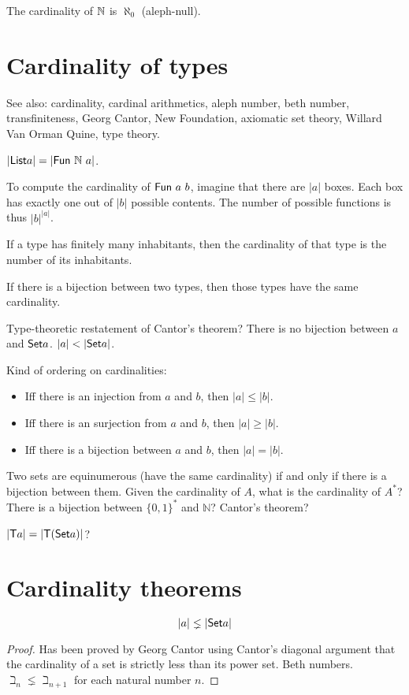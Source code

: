 The cardinality of $\mathbb{N}$ is $\aleph_0$ (aleph-null).

\section{Cardinality of types}

See also: cardinality, cardinal arithmetics,
aleph number, beth number, transfiniteness, Georg Cantor,
New Foundation, axiomatic set theory, Willard Van Orman Quine, type theory.

$|\textsf{List}{a}| = |\mathsf{Fun}~\mathbb{N}~a|$.

To compute the cardinality of $\mathsf{Fun}~a~b$,
imagine that there are $|a|$ boxes.
Each box has exactly one out of $|b|$ possible contents.
The number of possible functions is thus $|b|^{|a|}$.

If a type has finitely many inhabitants,
then the cardinality of that type is the number of its inhabitants.

If there is a bijection between two types,
then those types have the same cardinality.

Type-theoretic restatement of Cantor's theorem?
There is no bijection between $a$ and $\textsf{Set}{a}$.
$|a| < |\textsf{Set}{a}|$.

Kind of ordering on cardinalities:
\begin{itemize}
    \item Iff there is an injection from $a$ and $b$, then $|a| \le |b|$.
    \item Iff there is an surjection from $a$ and $b$, then $|a| \ge |b|$.
    \item Iff there is a bijection between $a$ and $b$, then $|a| = |b|$.
\end{itemize}

Two sets are equinumerous (have the same cardinality) if and only if there is a bijection between them.
Given the cardinality of $A$, what is the cardinality of $A^*$?
There is a bijection between $\{0,1\}^*$ and $\mathbb{N}$?
Cantor's theorem?

$|\mathsf{T} a| = |\mathsf{T} (\textsf{Set}{a})|$?

\section{Cardinality theorems}

\begin{mthm}
    \[
        |a| \lneq |\textsf{Set}{a}|
    \]
\begin{proof}
    Has been proved by Georg Cantor using Cantor's diagonal argument
    that the cardinality of a set is strictly less than its power set.
    Beth numbers.
    $\beth_n \lneq \beth_{n+1}$ for each natural number $n$.
\end{proof}
\end{mthm}

